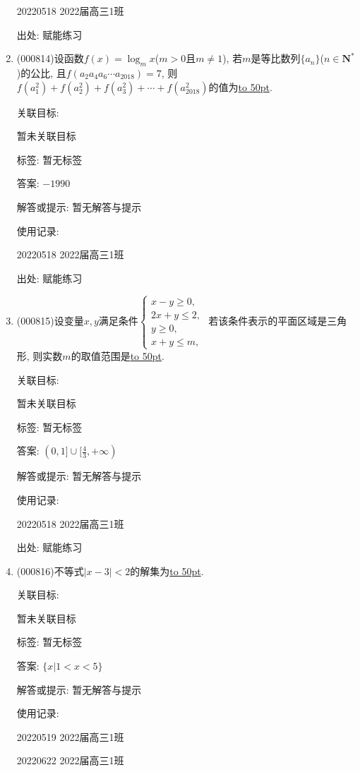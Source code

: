 \documentclass[10pt,a4paper]{article}
\newcommand{\blank}[1]{\underline{\hbox to #1pt{}}}
\begin{document}
\begin{enumerate}[1.]
20220518	2022届高三1班	


出处: 赋能练习
\item { (000814)}设函数$f(x)=\log_m x$($m>0$且$m\ne 1$), 若$m$是等比数列$\{a_n\}$($n\in \mathbf{N}^*$)的公比, 且$f(a_2a_4a_6\cdots a_{2018})=7$, 则$f(a_1^2)+f(a_2^2)+f(a_3^2)+\cdots+f(a_{2018}^2)$的值为\blank{50}.


关联目标:

暂未关联目标



标签: 暂无标签

答案: $-1990$

解答或提示: 暂无解答与提示

使用记录:

20220518	2022届高三1班	


出处: 赋能练习
\item { (000815)}设变量$x,y$满足条件$\begin{cases}  x-y\ge 0, \\ 2x+y\le 2, \\ y\ge 0, \\ x+y\le m, \end{cases}$ 若该条件表示的平面区域是三角形, 则实数$m$的取值范围是\blank{50}.


关联目标:

暂未关联目标



标签: 暂无标签

答案: $(0,1]\cup [\frac 43,+\infty)$

解答或提示: 暂无解答与提示

使用记录:

20220518	2022届高三1班	


出处: 赋能练习
\item { (000816)}不等式$|x-3|<2$的解集为\blank{50}.


关联目标:

暂未关联目标



标签: 暂无标签

答案: $\{x|1<x<5\}$

解答或提示: 暂无解答与提示

使用记录:

20220519	2022届高三1班	

20220622	2022届高三1班  	



\end{enumerate}
\end{document}
